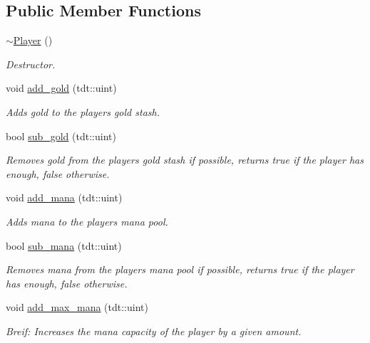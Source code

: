\subsection*{Public Member Functions}
\begin{DoxyCompactItemize}
\item 
\hyperlink{class_player_a749d2c00e1fe0f5c2746f7505a58c062}{$\sim$\+Player} ()
\begin{DoxyCompactList}\small\item\em Destructor. \end{DoxyCompactList}\item 
void \hyperlink{class_player_a26049c7f5cf9c76a3c9306f8c5cf6311}{add\+\_\+gold} (tdt\+::uint)
\begin{DoxyCompactList}\small\item\em Adds gold to the player\textquotesingle{}s gold stash. \end{DoxyCompactList}\item 
bool \hyperlink{class_player_a22dc25cd4f521bb6b86498fc454144a9}{sub\+\_\+gold} (tdt\+::uint)
\begin{DoxyCompactList}\small\item\em Removes gold from the player\textquotesingle{}s gold stash if possible, returns true if the player has enough, false otherwise. \end{DoxyCompactList}\item 
void \hyperlink{class_player_ae7fc69a2e5e9084b6bdb08c459444de7}{add\+\_\+mana} (tdt\+::uint)
\begin{DoxyCompactList}\small\item\em Adds mana to the player\textquotesingle{}s mana pool. \end{DoxyCompactList}\item 
bool \hyperlink{class_player_a163bdb15cf9b3d40e0a3d7c259a712fe}{sub\+\_\+mana} (tdt\+::uint)
\begin{DoxyCompactList}\small\item\em Removes mana from the player\textquotesingle{}s mana pool if possible, returns true if the player has enough, false otherwise. \end{DoxyCompactList}\item 
void \hyperlink{class_player_af3306f52959ada011d7aefc608e98c4c}{add\+\_\+max\+\_\+mana} (tdt\+::uint)
\begin{DoxyCompactList}\small\item\em Breif\+: Increases the mana capacity of the player by a given amount. \end{DoxyCompactList}\item 

\end{DoxyCompactItemize}
